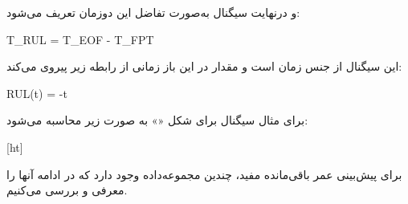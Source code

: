 و درنهایت سیگنال  به‌صورت تفاضل این دوزمان تعریف می‌شود:

T_{RUL} = T_{EOF} - T_{FPT}

این سیگنال از جنس زمان است و مقدار  در این باز زمانی از رابطه زیر پیروی می‌کند:

RUL(t) = -t


برای مثال سیگنال  برای شکل «» به صورت زیر محاسبه می‌شود:

[ht]






برای پیش‌بینی عمر باقی‌مانده مفید، چندین مجموعه‌داده وجود دارد که در ادامه آنها را معرفی و بررسی می‌کنیم.







































